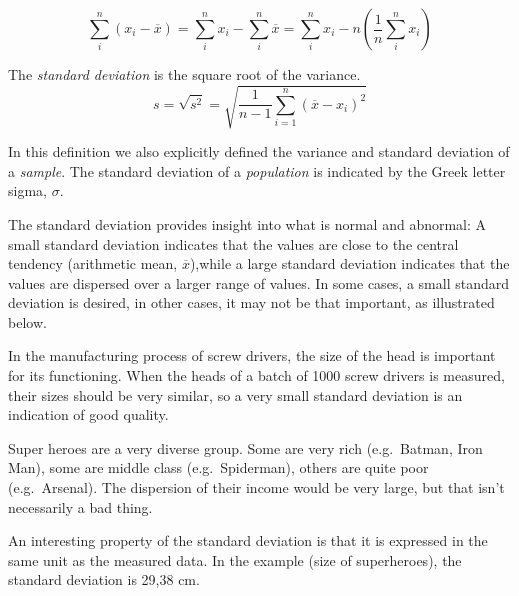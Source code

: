 \begin{equation}
\sum_{i}^{n}(x_{i} - \overline{x}) = \sum_{i}^{n}x_{i} - \sum_{i}^{n}\overline{x} = \sum_{i}^{n}x_{i} - n \left(\frac{1}{n}\sum_{i}^{n} x_{i}\right)
\label{eq:sumAvg}
\end{equation}

\begin{definition}
    The \emph{standard deviation} is the square root of the variance.
    \begin{equation}
    s = \sqrt{s^{2}} = \sqrt{\frac{1}{n-1} \sum_{i=1}^{n} \left(\overline{x} - x_i \right)^{2}}
    \label{eq:stdev}
    \end{equation}
\end{definition}

\begin{remark}[!!]
    In this definition we also explicitly defined the variance and standard deviation of a \emph{sample}. The standard deviation of a \emph{population} is indicated by the Greek letter sigma, $\sigma$.
\end{remark}

The standard deviation provides insight into what is normal and abnormal: 
A small standard deviation indicates that the values are close to the central tendency (arithmetic mean, $\overline{x}$),while  a large standard deviation indicates that the values are dispersed over a larger range of values. In some cases, a small standard deviation is desired, in other cases, it may not be that important, as illustrated below.

\begin{example}
  In the manufacturing process of screw drivers, the size of the head is important for its functioning. When the heads of a batch of 1000 screw drivers is measured, their sizes should be very similar, so a very small standard deviation is an indication of good quality.    
\end{example}

\begin{example}
  Super heroes are a very diverse group. Some are very rich (e.g.~Batman, Iron Man), some are middle class (e.g.~Spiderman), others are quite poor (e.g.~Arsenal). The dispersion of their income would be very large, but that isn't necessarily a bad thing.
\end{example}

An interesting property of the standard deviation is that it is expressed in the same unit as the measured data. In the example (size of superheroes), the standard deviation is 29,38 cm. 

